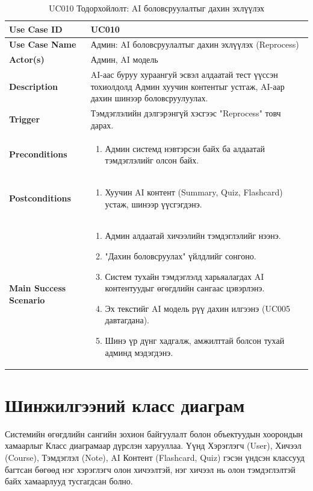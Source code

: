 \begin{longtable}{|p{4cm}|p{11cm}|}
\caption{UC010 Тодорхойлолт: AI боловсруулалтыг дахин эхлүүлэх} \\
\hline
\textbf{Use Case ID} & UC010 \\ \hline
\textbf{Use Case Name} & Админ: AI боловсруулалтыг дахин эхлүүлэх (Reprocess) \\ \hline
\textbf{Actor(s)} & Админ, AI модель \\ \hline
\textbf{Description} & AI-аас буруу хураангуй эсвэл алдаатай тест үүссэн тохиолдолд Админ хуучин контентыг устгаж, AI-аар дахин шинээр боловсруулуулах. \\ \hline
\textbf{Trigger} & Тэмдэглэлийн дэлгэрэнгүй хэсгээс "Reprocess" товч дарах. \\ \hline
\textbf{Preconditions} & 
\begin{enumerate}
    \item Админ системд нэвтэрсэн байх ба алдаатай тэмдэглэлийг олсон байх.
\end{enumerate} \\ \hline
\textbf{Postconditions} & 
\begin{enumerate}
    \item Хуучин AI контент (Summary, Quiz, Flashcard) устаж, шинээр үүсгэгдэнэ.
\end{enumerate} \\ \hline
\textbf{Main Success Scenario} & 
\begin{enumerate}
    \item Админ алдаатай хичээлийн тэмдэглэлийг нээнэ.
    \item "Дахин боловсруулах" үйлдлийг сонгоно.
    \item Систем тухайн тэмдэглэлд харьяалагдах AI контентуудыг өгөгдлийн сангаас цэвэрлэнэ.
    \item Эх текстийг AI модель рүү дахин илгээнэ (UC005 давтагдана).
    \item Шинэ үр дүнг хадгалж, амжилттай болсон тухай админд мэдэгдэнэ.
\end{enumerate} \\ \hline
\end{longtable}

\section{Шинжилгээний класс диаграм}
Системийн өгөгдлийн сангийн зохион байгуулалт болон объектуудын хоорондын хамаарлыг Класс диаграмаар дүрслэн харууллаа. Үүнд Хэрэглэгч (User), Хичээл (Course), Тэмдэглэл (Note), AI Контент (Flashcard, Quiz) гэсэн үндсэн классууд багтсан бөгөөд нэг хэрэглэгч олон хичээлтэй, нэг хичээл нь олон тэмдэглэлтэй байх хамаарлууд тусгагдсан болно.

